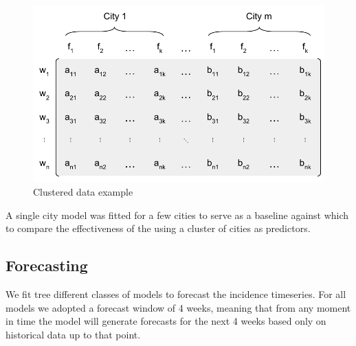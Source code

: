 \documentclass[12pt]{report}
\begin{document}
\begin{figure}[!ht]
\centering
\includegraphics[scale=0.8]{cluster_matrix.pdf}
\caption{Clustered data example}
\label{fig:m_cluster}
\end{figure}

A single city model was fitted  for a few  cities to serve as a 
baseline against which to compare the effectiveness of the using a cluster of cities as predictors.

\subsection{Forecasting}

We fit tree different classes of models to forecast the incidence timeseries. For all models we adopted a forecast window of 4 weeks, meaning that from any moment in time the model will generate forecasts for the next 4 weeks based only on historical data up to that point.
\end{document}
